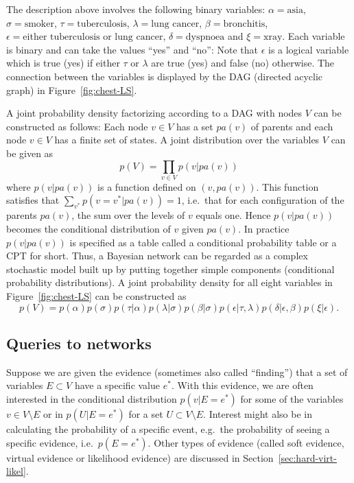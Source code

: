 \documentclass[10pt]{article}\usepackage[]{graphicx}\usepackage[]{xcolor}
\begin{document}
The description above involves the following binary variables:
$\alpha=\mbox{asia}$,
$\sigma=\mbox{smoker}$,
$\tau=\mbox{tuberculosis}$,
$\lambda=\mbox{lung cancer}$,
$\beta=\mbox{bronchitis}$,
$\epsilon=\mbox{either tuberculosis or lung cancer}$,
$\delta=\mbox{dyspnoea}$ and
$\xi=\mbox{xray}$. 
Each variable is binary and can take the values ``yes'' and ``no'':
Note that $\epsilon$ is a logical variable which is
true (yes) if either $\tau$ or $\lambda$ are true (yes) and false (no) otherwise.
The connection between the variables is displayed by the DAG (directed acyclic graph) in
Figure~\ref{fig:chest-LS}.

A joint probability density factorizing according to a DAG with nodes
$V$ can be constructed as follows: Each node $v\in V$ has a set $pa(v)$ of parents and each node
$v\in V$ has a finite set of states. A joint distribution
over the variables $V$ can be given as
\begin{equation}
  \label{eq:dagfact1}
  p(V) = \prod_{v\in V} p(v|pa(v))
\end{equation}
where $p(v|pa(v))$ is a function defined on $(v,pa(v))$. This function
satisfies that $\sum_{v^*} p(v=v^*|pa(v))=1$, i.e.\ that
for each configuration of the parents $pa(v)$, the sum
over the levels of $v$ equals one. Hence $p(v|pa(v))$ becomes the
conditional distribution of $v$ given $pa(v)$.
In practice $p(v|pa(v))$ is specified as a table called a conditional
probability table or a CPT for short.
Thus, a Bayesian network can be regarded as a complex stochastic model built up by
putting together simple components (conditional probability
distributions).
A joint probability density for all eight variables in
Figure~\ref{fig:chest-LS}
can be constructed as 
\begin{equation}
  \label{eq:chestfact1}
  p(V) =
  p(\alpha)p(\sigma)p(\tau|\alpha)p(\lambda|\sigma)p(\beta|\sigma)p(\epsilon|\tau,\lambda)
  p(\delta|\epsilon, \beta)p(\xi|\epsilon).
\end{equation}



\subsection{Queries to networks}
\label{sec:xxx}

Suppose we are given the evidence (sometimes also called ``finding'')
that a set of variables $E\subset V$
have a specific value $e^*$.
With this evidence, we are often interested in the conditional
distribution $p(v|E=e^*)$
for some of the variables $v \in V \setminus E$
or in $p(U|E=e^*)$
for a set $U\subset V \setminus E$. Interest might also be in
calculating the probability of a specific event, e.g.\ the probability
of seeing a specific evidence, i.e.\ $p(E=e^*)$.
Other types of evidence (called soft evidence, virtual evidence or likelihood evidence) are discussed in
Section~\ref{sec:hard-virt-likel}.
\end{document}
